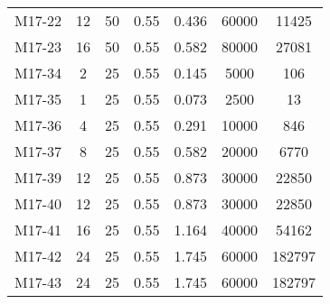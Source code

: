 \begin{table}
\begin{tabular}{lcccccc}
 M17-22 &  12 &  50 &  0.55 &  0.436 &  60000 &  11425 \\
 M17-23 &  16 &  50 &  0.55 &  0.582 &  80000 &  27081 \\
 M17-34 &   2 &  25 &  0.55 &  0.145 &   5000 &    106 \\
 M17-35 &   1 &  25 &  0.55 &  0.073 &   2500 &     13 \\
 M17-36 &   4 &  25 &  0.55 &  0.291 &  10000 &    846 \\
 M17-37 &   8 &  25 &  0.55 &  0.582 &  20000 &   6770 \\
 M17-39 &  12 &  25 &  0.55 &  0.873 &  30000 &  22850 \\
 M17-40 &  12 &  25 &  0.55 &  0.873 &  30000 &  22850 \\
 M17-41 &  16 &  25 &  0.55 &  1.164 &  40000 &  54162 \\
 M17-42 &  24 &  25 &  0.55 &  1.745 &  60000 &  182797 \\
 M17-43 &  24 &  25 &  0.55 &  1.745 &  60000 &  182797 \\
\end{tabular}
\end{table}
